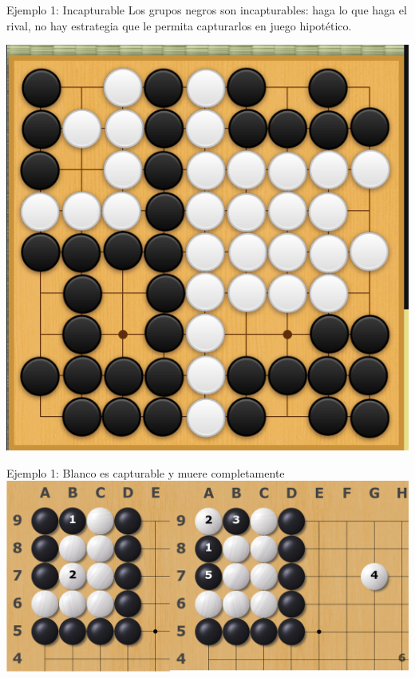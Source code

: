 \documentclass{beamer}
\begin{document}
\begin{frame}{Ejemplo 1: Incapturable}
    Los grupos negros son incapturables: haga lo que haga el rival, no hay estrategia que le permita capturarlos en juego hipotético.
    
    \includegraphics[scale=0.3]{incapturable.png}
    
\end{frame}

\begin{frame}{Ejemplo 1: Blanco es capturable y muere completamente}
    \includegraphics[scale=0.27]{bent4.png}
    
\end{frame}
\end{document}
